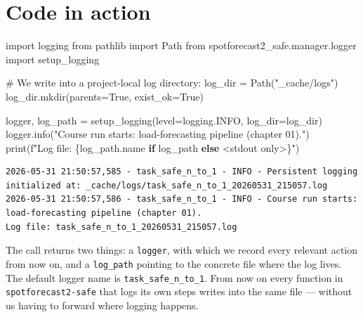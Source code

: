 \documentclass[
  english,
  letterpaper,
]{scrbook}
\newenvironment{Shaded}{\begin{snugshade}}{\end{snugshade}}
\newcommand{\BuiltInTok}[1]{\textcolor[rgb]{0.00,0.23,0.31}{#1}}
\newcommand{\CommentTok}[1]{\textcolor[rgb]{0.37,0.37,0.37}{#1}}
\newcommand{\ControlFlowTok}[1]{\textcolor[rgb]{0.00,0.23,0.31}{\textbf{#1}}}
\newcommand{\ImportTok}[1]{\textcolor[rgb]{0.00,0.46,0.62}{#1}}
\newcommand{\NormalTok}[1]{\textcolor[rgb]{0.00,0.23,0.31}{#1}}
\newcommand{\OperatorTok}[1]{\textcolor[rgb]{0.37,0.37,0.37}{#1}}
\newcommand{\SpecialCharTok}[1]{\textcolor[rgb]{0.37,0.37,0.37}{#1}}
\newcommand{\SpecialStringTok}[1]{\textcolor[rgb]{0.13,0.47,0.30}{#1}}
\newcommand{\StringTok}[1]{\textcolor[rgb]{0.13,0.47,0.30}{#1}}
\newcommand{\VariableTok}[1]{\textcolor[rgb]{0.07,0.07,0.07}{#1}}
\begin{document}
\section{Code in action}\label{code-in-action}

\protect{}\label{setup-logger}
\begin{Shaded}
\begin{Highlighting}[]
\ImportTok{import}\NormalTok{ logging}
\ImportTok{from}\NormalTok{ pathlib }\ImportTok{import}\NormalTok{ Path}
\ImportTok{from}\NormalTok{ spotforecast2\_safe.manager.logger }\ImportTok{import}\NormalTok{ setup\_logging}

\CommentTok{\# We write into a project{-}local log directory:}
\NormalTok{log\_dir }\OperatorTok{=}\NormalTok{ Path(}\StringTok{"\_cache/logs"}\NormalTok{)}
\NormalTok{log\_dir.mkdir(parents}\OperatorTok{=}\VariableTok{True}\NormalTok{, exist\_ok}\OperatorTok{=}\VariableTok{True}\NormalTok{)}

\NormalTok{logger, log\_path }\OperatorTok{=}\NormalTok{ setup\_logging(level}\OperatorTok{=}\NormalTok{logging.INFO, log\_dir}\OperatorTok{=}\NormalTok{log\_dir)}
\NormalTok{logger.info(}\StringTok{"Course run starts: load{-}forecasting pipeline (chapter 01)."}\NormalTok{)}
\BuiltInTok{print}\NormalTok{(}\SpecialStringTok{f"Log file: }\SpecialCharTok{\{}\NormalTok{log\_path}\SpecialCharTok{.}\NormalTok{name }\ControlFlowTok{if}\NormalTok{ log\_path }\ControlFlowTok{else} \StringTok{\textquotesingle{}\textless{}stdout only\textgreater{}\textquotesingle{}}\SpecialCharTok{\}}\SpecialStringTok{"}\NormalTok{)}
\end{Highlighting}
\end{Shaded}

\begin{verbatim}
2026-05-31 21:50:57,585 - task_safe_n_to_1 - INFO - Persistent logging initialized at: _cache/logs/task_safe_n_to_1_20260531_215057.log
2026-05-31 21:50:57,586 - task_safe_n_to_1 - INFO - Course run starts: load-forecasting pipeline (chapter 01).
Log file: task_safe_n_to_1_20260531_215057.log
\end{verbatim}

The call returns two things: a \texttt{logger}, with which we record
every relevant action from now on, and a \texttt{log\_path} pointing to
the concrete file where the log lives. The default logger name is
\texttt{task\_safe\_n\_to\_1}. From now on every function in
\texttt{spotforecast2-safe} that logs its own steps writes into the same
file --- without us having to forward where logging happens.
\end{document}
